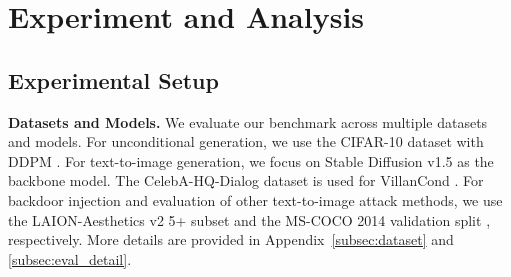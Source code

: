 \section{Experiment and Analysis}
\label{sec:experiment}

\subsection{Experimental Setup}
\label{subsec:exp_setup}
\textbf{Datasets and Models. }
We evaluate our benchmark across multiple datasets and models. For unconditional generation, we use the CIFAR-10 dataset \cite{alex2009learning} with DDPM \cite{ho2020denoising}. For text-to-image generation, we focus on Stable Diffusion v1.5 as the backbone model. The CelebA-HQ-Dialog dataset \cite{jiang2021talk} is used for VillanCond \cite{chou2024villandiffusion}. For backdoor injection and evaluation of other text-to-image attack methods, we use the LAION-Aesthetics v2 5+ subset \cite{schuhmann2022laion} and the MS-COCO 2014 validation split \cite{lin2014microsoft}, respectively. More details are provided in Appendix~\ref{subsec:dataset} and \ref{subsec:eval_detail}.





